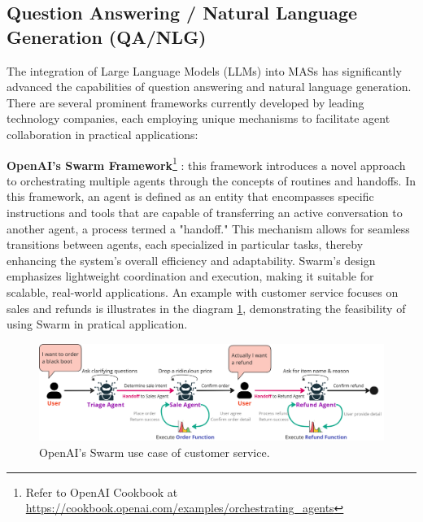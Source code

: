 \documentclass[acmsmall,nonacm]{acmart}
\begin{document}
    \subsection{Question Answering / Natural Language Generation (QA/NLG)}

    The integration of Large Language Models (LLMs) into MASs has significantly advanced the capabilities of question answering and natural language generation. There are several prominent frameworks currently developed by leading technology companies, each employing unique mechanisms to facilitate agent collaboration in practical applications:
    
    \textbf{OpenAI's Swarm Framework}\footnote{\label{foot:swarm}Refer to OpenAI Cookbook at \url{https://cookbook.openai.com/examples/orchestrating\_agents}} : this framework introduces a novel approach to orchestrating multiple agents through the concepts of routines and handoffs. In this framework, an agent is defined as an entity that encompasses specific instructions and tools that are capable of transferring an active conversation to another agent, a process termed a "handoff." This mechanism allows for seamless transitions between agents, each specialized in particular tasks, thereby enhancing the system's overall efficiency and adaptability. Swarm's design emphasizes lightweight coordination and execution, making it suitable for scalable, real-world applications. An example with customer service focuses on sales and refunds is illustrates in the diagram \ref{fig:openai-swarm}, demonstrating the feasibility of using Swarm in pratical application.

    \begin{figure}[!ht]
        \centering
        \includegraphics[width=\linewidth]{image-lib/swarm-miro.png}
        \caption{OpenAI's Swarm use case of customer service.}
        \label{fig:openai-swarm}
    \end{figure}
\end{document}
